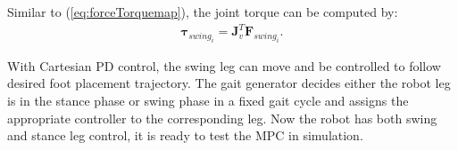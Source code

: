 Similar to (\ref{eq:forceTorquemap}), the joint torque can be computed by:
\begin{align}
\label{eq:forceTorqueMapSwing}
\bm {\tau}_{swing_i} =  \bm J_v^T \bm F_{swing_i}.
\end{align}

With Cartesian PD control, the swing leg can move and be controlled to follow desired foot placement trajectory. The gait generator decides either the robot leg is in the stance phase or swing phase in a fixed gait cycle and assigns the appropriate controller to the corresponding leg. Now the robot has both swing and stance leg control, it is ready to test the MPC in simulation.